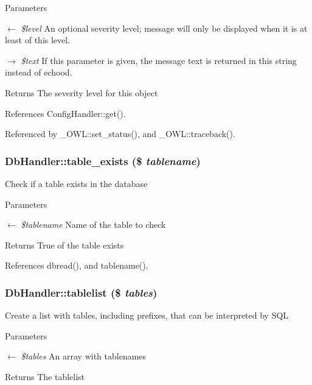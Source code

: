 \begin{DoxyParams}{Parameters}
\item[\mbox{$\leftarrow$} {\em \$level}]An optional severity level; message will only be displayed when it is at least of this level. \item[\mbox{$\rightarrow$} {\em \$text}]If this parameter is given, the message text is returned in this string instead of echood. \end{DoxyParams}
\begin{DoxyReturn}{Returns}
The severity level for this object 
\end{DoxyReturn}


References ConfigHandler::get().



Referenced by \_\-OWL::set\_\-status(), and \_\-OWL::traceback().

\subsubsection[{table\_\-exists}]{\setlength{\rightskip}{0pt plus 5cm}DbHandler::table\_\-exists (\$ {\em tablename})}\label{classDbHandler_a11e750a2c46022241eba49df81607ba9}
Check if a table exists in the database 
\begin{DoxyParams}{Parameters}
\item[\mbox{$\leftarrow$} {\em \$tablename}]Name of the table to check \end{DoxyParams}
\begin{DoxyReturn}{Returns}
True of the table exists 
\end{DoxyReturn}


References dbread(), and tablename().

\subsubsection[{tablelist}]{\setlength{\rightskip}{0pt plus 5cm}DbHandler::tablelist (\$ {\em tables})}\label{classDbHandler_a2b6376ab821eb4aa2f086d852099c6c1}
Create a list with tables, including prefixes, that can be interpreted by SQL


\begin{DoxyParams}{Parameters}
\item[\mbox{$\leftarrow$} {\em \$tables}]An array with tablenames \end{DoxyParams}
\begin{DoxyReturn}{Returns}
The tablelist 
\end{DoxyReturn}


